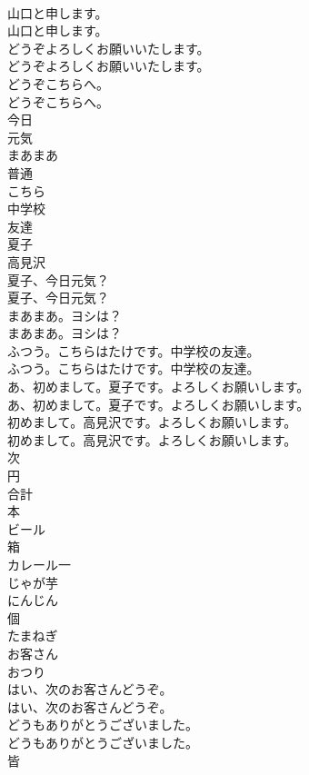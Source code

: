 \documentclass[8pt]{extreport}
\begin{document}
\begin{CJK}{UTF8}{min}
\\	山口と申します。	
\\	山口と申します。 
\\	どうぞよろしくお願いいたします。	
\\	どうぞよろしくお願いいたします。 
\\	どうぞこちらへ。	
\\	どうぞこちらへ。 
\\	今日
\\	元気
\\	まあまあ
\\	普通
\\	こちら
\\	中学校
\\	友達
\\	夏子
\\	高見沢
\\	夏子、今日元気？	
\\	夏子、今日元気？ 
\\	まあまあ。ヨシは？	
\\	まあまあ。ヨシは？ 
\\	ふつう。こちらはたけです。中学校の友達。	
\\	ふつう。こちらはたけです。中学校の友達。 
\\	あ、初めまして。夏子です。よろしくお願いします。	
\\	あ、初めまして。夏子です。よろしくお願いします。 
\\	初めまして。高見沢です。よろしくお願いします。	
\\	初めまして。高見沢です。よろしくお願いします。 
\\	次
\\	円
\\	合計
\\	本
\\	ビール
\\	箱
\\	カレール一
\\	じゃが芋
\\	にんじん
\\	個
\\	たまねぎ
\\	お客さん
\\	おつり
\\	はい、次のお客さんどうぞ。	
\\	はい、次のお客さんどうぞ。 
\\	どうもありがとうございました。	
\\	どうもありがとうございました。 
\\	皆

\end{CJK}
\end{document}
